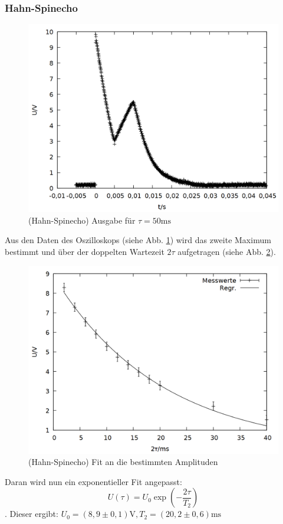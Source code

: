\subsubsection{Hahn-Spinecho}
\begin{figure}[h]
\centering
\includegraphics[width=0.75\linewidth]{data/p402_443_data/hahn_sequenz/plot_146.png}
\caption{(Hahn-Spinecho) Ausgabe für $\tau = 50\si{\milli\second}$}
\label{fig:hahn_bsp}
\end{figure}

Aus den Daten des Oszilloskops (siehe Abb. \ref{fig:hahn_bsp}) wird das zweite Maximum bestimmt und über der doppelten Wartezeit $2\tau$ aufgetragen (siehe Abb. \ref{fig:hahn_data}).
\begin{figure}[h]
\centering
\includegraphics[width=0.75\linewidth]{data/p402_443_data/hahn_sequenz/out_hahn.png}
\caption{(Hahn-Spinecho) Fit an die bestimmten Amplituden}
\label{fig:hahn_data}
\end{figure}

Daran wird nun ein exponentieller Fit angepasst: $$U(\tau) = U_0\exp{\left(-\frac{2\tau}{T_2}\right)}$$. Dieser ergibt: $U_0 = (8,9\pm 0,1)\si{\volt}, T_2 = (20,2\pm 0,6) \si{\milli\second}$

